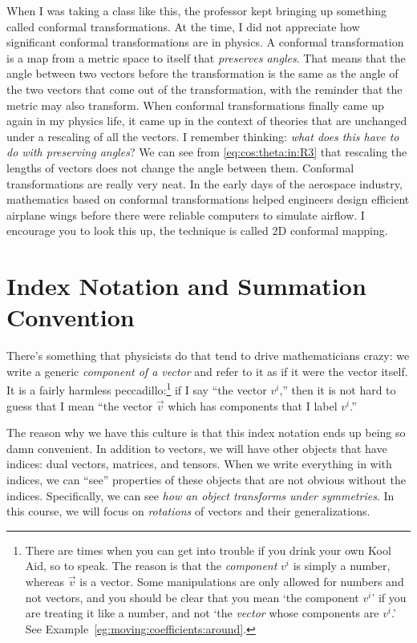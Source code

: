 \documentclass[12pt]{article}
\begin{document}
\begin{example}
When I was taking a class like this, the professor kept bringing up something called conformal transformations. At the time, I did not appreciate how significant conformal transformations are in physics. A conformal transformation is a map from a metric space to itself that \emph{preserves angles}. That means that the angle between two vectors before the transformation is the same as the angle of the two vectors that come out of the transformation, with the reminder that the metric may also transform. When conformal transformations finally came up again in my physics life, it came up in the context of theories that are unchanged under a rescaling of all the vectors. I remember thinking: \emph{what does this have to do with preserving angles}? We can see from \eqref{eq:cos:theta:in:R3} that rescaling the lengths of vectors does not change the angle between them. Conformal transformations are really very neat. In the early days of the aerospace industry, mathematics based on conformal transformations helped engineers design efficient airplane wings before there were reliable computers to simulate airflow. I encourage you to look this up, the technique is called 2D conformal mapping.
\end{example}

\section{Index Notation and Summation Convention}
\label{sec:index:notation}

There's something that physicists do that tend to drive mathematicians crazy: we write a generic \emph{component of a vector} and refer to it as if it were the vector itself. It is a fairly harmless peccadillo:\footnote{There are times when you can get into trouble if you drink your own Kool Aid, so to speak. The reason is that the \emph{component} $v^i$ is simply a number, whereas $\vec{v}$ is a vector. Some manipulations are only allowed for numbers and not vectors, and you should be clear that you mean `the component $v^i$' if you are treating it like a number, and not `the \emph{vector} whose components are $v^i$.' See Example~\ref{eg:moving:coefficients:around}.} if I say ``the vector $v^i$,'' then it is not hard to guess that I mean ``the vector $\vec{v}$ which has components that I label $v^i$.''

The reason why we have this culture is that this index notation ends up being so damn convenient. In addition to vectors, we will have other objects that have indices: dual vectors, matrices, and tensors. When we write everything in with indices, we can ``see'' properties of these objects that are not obvious without the indices. Specifically, we can see \emph{how an object transforms under symmetries}. In this course, we will focus on \emph{rotations} of vectors and their generalizations.  
\end{document}
